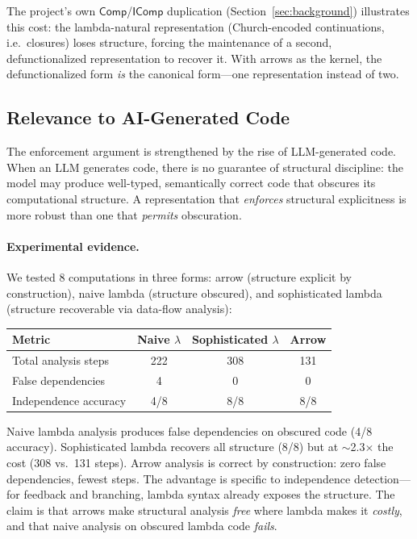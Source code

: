 \documentclass[11pt,a4paper]{article}
\theoremstyle{definition}
\theoremstyle{remark}
\begin{document}
The project's own $\mathsf{Comp}$/$\mathsf{IComp}$ duplication
(Section~\ref{sec:background}) illustrates this cost: the lambda-natural
representation (Church-encoded continuations, i.e.\ closures) loses
structure, forcing the maintenance of a second, defunctionalized
representation to recover it. With arrows as the kernel, the
defunctionalized form \emph{is} the canonical form---one representation
instead of two.

\subsection{Relevance to AI-Generated Code}

The enforcement argument is strengthened by the rise of LLM-generated
code. When an LLM generates code, there is no guarantee of structural
discipline: the model may produce well-typed, semantically correct code
that obscures its computational structure. A representation that
\emph{enforces} structural explicitness is more robust than one that
\emph{permits} obscuration.

\paragraph{Experimental evidence.}
We tested 8 computations in three forms: arrow (structure explicit by
construction), naive lambda (structure obscured), and sophisticated
lambda (structure recoverable via data-flow analysis):

\begin{center}
\begin{tabular}{lccc}
\hline
Metric & Naive $\lambda$ & Sophisticated $\lambda$ & Arrow \\
\hline
Total analysis steps & 222 & 308 & 131 \\
False dependencies & 4 & 0 & 0 \\
Independence accuracy & 4/8 & 8/8 & 8/8 \\
\hline
\end{tabular}
\end{center}

Naive lambda analysis produces false dependencies on obscured code
(4/8 accuracy). Sophisticated lambda recovers all structure (8/8) but
at $\sim$2.3$\times$ the cost (308 vs.\ 131 steps). Arrow analysis is
correct by construction: zero false dependencies, fewest steps. The
advantage is specific to independence detection---for feedback and
branching, lambda syntax already exposes the structure. The claim is
that arrows make structural analysis \emph{free} where lambda makes it
\emph{costly}, and that naive analysis on obscured lambda code
\emph{fails}.
\end{document}
